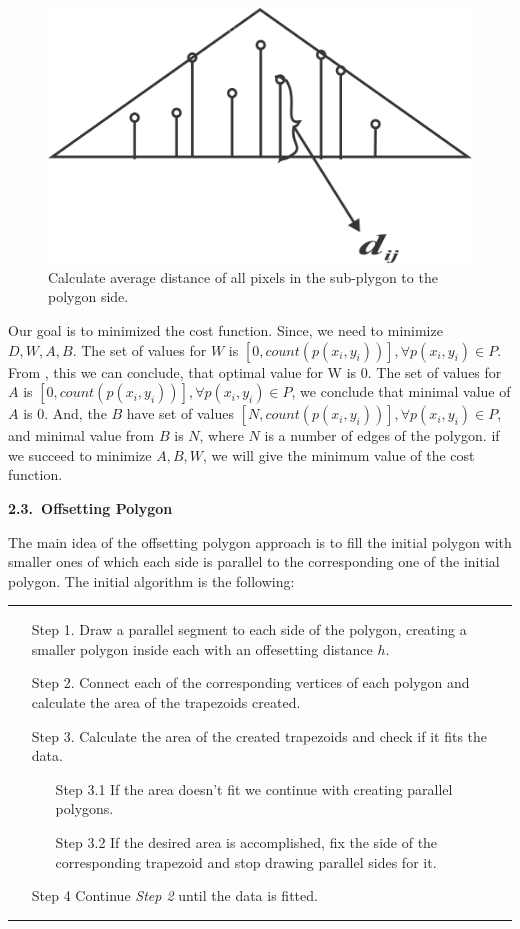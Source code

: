 \documentclass[11pt,leqno]{book}
\newcommand{\subsect}[1]{\vskip 3mm\par{\bf#1}}
\begin{document}
\begin{figure}[h!]
  \centering
  \includegraphics[width=.5\linewidth]{pic06.png}
  \caption{Calculate average distance of all pixels in the sub-plygon to the polygon side.}
\label{fig:four}
\end{figure}
\FloatBarrier

Our goal is to minimized the cost function. Since, we need to minimize $D, W, A, B$. The set of values for $W$ is $[0, count( p(x_i, y_i))], \forall p(x_i, y_i) \in P$. From , this we can conclude, that optimal value for W is 0.
The set of values for $A$ is $[0, count (p(x_i, y_i))], \forall p(x_i, y_i) \in P$, we conclude that minimal value of $A$ is 0. And, the $B$ have set of values $[N,count( p(x_i, y_i))], \forall p(x_i, y_i) \in P$, and minimal value from $B$ is $N$, where $N$ is a number of edges of the polygon.
if we succeed to minimize $A, B, W$, we will give the minimum value of the cost function.

\subsect{2.3.~Offsetting Polygon}

The main idea of the offsetting polygon approach is to fill the initial polygon with smaller ones of which each side is parallel to the corresponding one of the initial polygon. The initial algorithm is the following:

\noindent\rule{\textwidth}{1pt}
\begin{itemize}

\item[Step 1.] Draw a parallel segment to each side of the polygon, creating a smaller polygon inside each with an offesetting distance $h$. 
\item[Step 2.] Connect each of the corresponding vertices of each polygon and calculate the area of the trapezoids created.
\item[Step 3.] Calculate the area of the created trapezoids and check if it fits the data.
\begin{itemize}
\item[Step 3.1] If the area doesn't fit we continue with creating parallel polygons.
\item[Step 3.2] If the desired area is accomplished, fix the side of the corresponding trapezoid and stop drawing parallel sides for it.
\end{itemize}
  \item[Step 4] Continue \textit{Step 2} until the data is fitted.
\end{itemize}
\noindent\rule{\textwidth}{1pt}
\end{document}
